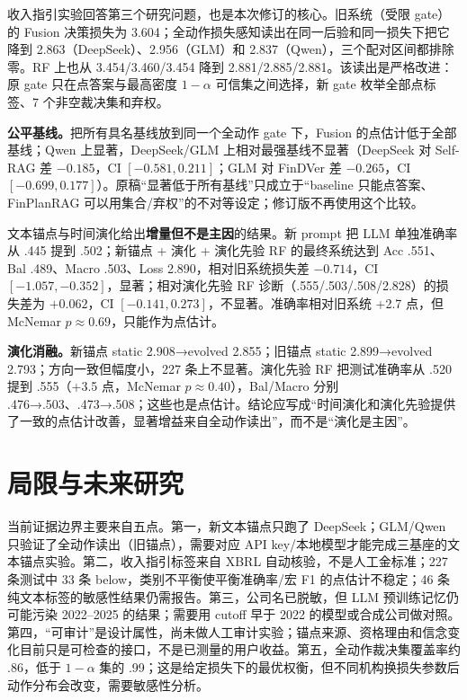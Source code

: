 收入指引实验回答第三个研究问题，也是本次修订的核心。旧系统（受限 gate）的 Fusion 决策损失为 3.604；全动作损失感知读出在同一后验和同一损失下把它降到 2.863（DeepSeek）、2.956（GLM）和 2.837（Qwen），三个配对区间都排除零。RF 上也从 3.454/3.460/3.454 降到 2.881/2.885/2.881。该读出是严格改进：原 gate 只在点答案与最高密度 $1-\alpha$ 可信集之间选择，新 gate 枚举全部点标签、7 个非空裁决集和弃权。

\begin{revbox}
\noindent\textbf{公平基线。}把所有具名基线放到同一个全动作 gate 下，Fusion 的点估计低于全部基线；Qwen 上显著，DeepSeek/GLM 上相对最强基线不显著（DeepSeek 对 Self-RAG 差 $-0.185$，CI $[-0.581,0.211]$；GLM 对 FinDVer 差 $-0.265$，CI $[-0.699,0.177]$）。原稿“显著低于所有基线”只成立于“baseline 只能点答案、FinPlanRAG 可以用集合/弃权”的不对等设定；修订版不再使用这个比较。
\end{revbox}

文本锚点与时间演化给出\textbf{增量但不是主因}的结果。新 prompt 把 LLM 单独准确率从 .445 提到 .502；新锚点 + 演化 + 演化先验 RF 的最终系统达到 Acc .551、Bal .489、Macro .503、Loss 2.890，相对旧系统损失差 $-0.714$，CI $[-1.057,-0.352]$，显著；相对演化先验 RF 诊断（.555/.503/.508/2.828）的损失差为 $+0.062$，CI $[-0.141,0.273]$，不显著。准确率相对旧系统 +2.7 点，但 McNemar $p\approx0.69$，只能作为点估计。

\begin{revbox}
\noindent\textbf{演化消融。}新锚点 static 2.908→evolved 2.855；旧锚点 static 2.899→evolved 2.793；方向一致但幅度小，227 条上不显著。演化先验 RF 把测试准确率从 .520 提到 .555（+3.5 点，McNemar $p\approx0.40$），Bal/Macro 分别 .476→.503、.473→.508；这些也是点估计。结论应写成“时间演化和演化先验提供了一致的点估计改善，显著增益来自全动作读出”，而不是“演化是主因”。
\end{revbox}

\section{局限与未来研究}

当前证据边界主要来自五点。第一，新文本锚点只跑了 DeepSeek；GLM/Qwen 只验证了全动作读出（旧锚点），需要对应 API key/本地模型才能完成三基座的文本锚点实验。第二，收入指引标签来自 XBRL 自动核验，不是人工金标准；227 条测试中 33 条 below，类别不平衡使平衡准确率/宏 F1 的点估计不稳定；46 条纯文本标签的敏感性结果仍需报告。第三，公司名已脱敏，但 LLM 预训练记忆仍可能污染 2022--2025 的结果；需要用 cutoff 早于 2022 的模型或合成公司做对照。第四，“可审计”是设计属性，尚未做人工审计实验；锚点来源、资格理由和信念变化目前只是可检查的接口，不是已测量的用户收益。第五，全动作裁决集覆盖率约 .86，低于 $1-\alpha$ 集的 .99；这是给定损失下的最优权衡，但不同机构换损失参数后动作分布会改变，需要敏感性分析。

